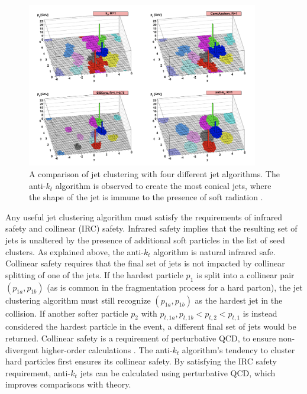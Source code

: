 \begin{figure}[h]
        \centering
	\includegraphics[width=0.9\textwidth]{figures/ch5/jet_algorithms}
	\caption{ A comparison of jet clustering with four different jet algorithms. The anti-$k_t$ algorithm is observed to create the most conical jets, where the shape of the jet is immune to the presence of soft radiation \cite{anti_kt}. }
	\label{fig:jet_algorithms}
\end{figure}

Any useful jet clustering algorithm must satisfy the requirements of infrared safety and collinear (IRC) safety. Infrared safety implies that the resulting set of jets is unaltered by the presence of additional soft particles in the list of seed clusters. As explained above, the anti-$k_t$ algorithm is natural infrared safe. Collinear safety requires that the final set of jets is not impacted by collinear splitting of one of the jets. If the hardest particle $p_1$ is split into a collinear pair $(p_{1a},p_{1b})$ (as is common in the fragmentation process for a hard parton), the jet clustering algorithm must still recognize $(p_{1a},p_{1b})$ as the hardest jet in the collision. If another softer particle $p_2$ with $p_{t,1a},p_{t,1b} < p_{t,2} < p_{t,1}$ is instead considered the hardest particle in the event, a different final set of jets would be returned. Collinear safety is a requirement of perturbative QCD, to ensure non-divergent higher-order calculations \cite{collinear_safety}. The anti-$k_t$ algorithm's tendency to cluster hard particles first ensures its collinear safety. By satisfying the IRC safety requirement, anti-$k_t$ jets can be calculated using perturbative QCD, which improves comparisons with theory. 
 
